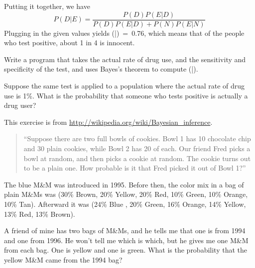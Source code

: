 \documentclass[12pt]{book}
\begin{document}
Putting it together, we have
%
\[ P(D|E) = \frac{P(D) P(E|D)}{P(D) P(E|D) + P(N) P(E|N)}\]
%
Plugging in the given values yields \Prob(\D|\E)~=~0.76, which means
that of the people who test positive, about 1 in 4 is innocent. 

\begin{exercise}
Write a program that takes the actual rate of drug use, and the
sensitivity and specificity of the test, and uses Bayes's theorem
to compute \Prob(\D|\E).

Suppose the same test is applied to a population where the actual
rate of drug use is 1\%.  What is the probability that someone
who tests positive is actually a drug user?

\end{exercise}


\begin{exercise}
This exercise is from \url{http://wikipedia.org/wiki/Bayesian_inference}.

\begin{quote}

``Suppose there are two full bowls of cookies. Bowl 1 has 10 chocolate
  chip and 30 plain cookies, while Bowl 2 has 20 of each. Our friend
  Fred picks a bowl at random, and then picks a cookie at random. The
  cookie turns out to be a plain one. How probable is it that Fred
  picked it out of Bowl 1?''

\end{quote}

\end{exercise}

\begin{exercise}

The blue M\&M was introduced in 1995.  Before then, the color mix in
a bag of plain M\&Ms was (30\% Brown, 20\% Yellow, 20\% Red, 10\%
Green, 10\% Orange, 10\% Tan).  Afterward it was (24\% Blue , 20\%
Green, 16\% Orange, 14\% Yellow, 13\% Red, 13\% Brown).


A friend of mine has two bags of M\&Ms, and he tells me
that one is from 1994 and one from 1996.  He won't tell me which is
which, but he gives me one M\&M from each bag.  One is yellow and
one is green.  What is the probability that the yellow M\&M came
from the 1994 bag?
  
\end{exercise}
\end{document}
